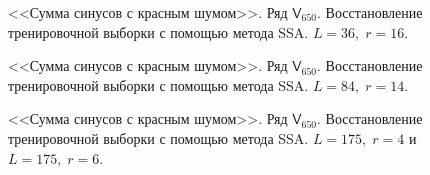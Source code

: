 \documentclass[specialist,
               substylefile = spbu.rtx,
               subf,href,colorlinks=true, 12p]{disser}
\begin{document}
\begin{figure}[H]
	\captionsetup{justification=centering}
	\caption{<<Сумма синусов с красным шумом>>. Ряд $\mathsf{V}_{650}$. Восстановление тренировочной выборки с помощью метода SSA. $L = 36, \; r = 16$.}
	\label{ser_ssa_L36_r16}
\end{figure}

\begin{figure}[H]
	\captionsetup{justification=centering}
	\caption{<<Сумма синусов с красным шумом>>. Ряд $\mathsf{V}_{650}$. Восстановление тренировочной выборки с помощью метода SSA. $L = 84, \; r = 14$.}
	\label{ser_ssa_L84_r14}
\end{figure}

\begin{figure}[H]
	\captionsetup{justification=centering}
	\caption{<<Сумма синусов с красным шумом>>. Ряд $\mathsf{V}_{650}$. Восстановление тренировочной выборки с помощью метода SSA. $L = 175, \; r = 4$ и $L = 175, \; r = 6$.}
	\label{ser_ssa_r4_r6}
\end{figure}
\end{document}
